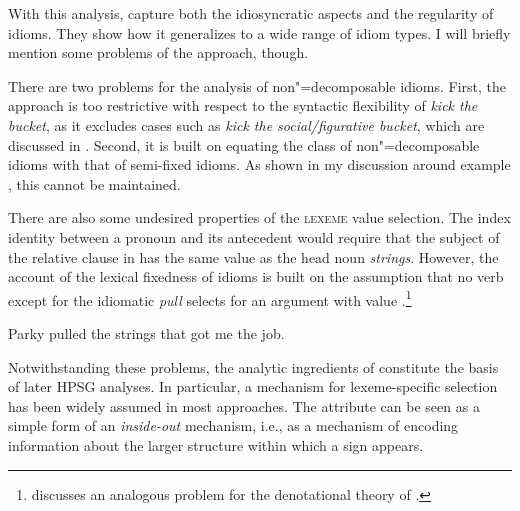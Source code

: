 \documentclass[output=paper
 	        ,biblatex
                ,babelshorthands
                ,newtxmath
                ,draftmode
                ,colorlinks, citecolor=brown
]{langscibook}
\begin{document}
\ea %
\label{ke-kick}
\z 


With this analysis, \citet{KE94a} capture both the idiosyncratic aspects and the regularity of idioms. 
They show how it generalizes to a wide range of idiom types. 
I will briefly mention some problems of the approach, though.

There are two problems for the analysis of non"=decomposable idioms.  First, the approach is too
restrictive with respect to the syntactic flexibility of \emph{kick the bucket}, as it excludes
cases such as \emph{kick the social/figurative bucket}, which are discussed in \citet{Ernst:81}.
Second, it is built on equating the class of non"=decomposable idioms with that of semi-fixed
idioms. As shown in my discussion around example , this cannot be maintained.

There are also some undesired properties of the \textsc{lexeme} value selection. The index identity
between a pronoun and its antecedent would require that the subject of the relative
clause in  has the same  value as the head noun
\emph{strings}. However, the account of the lexical fixedness of idioms is built on the assumption
that no verb except for the idiomatic \emph{pull} selects for an argument with  value
.\footnote{\citet{Pulman:93} discusses an analogous problem for the denotational
  theory of \citet{GKPS85a}.}

\ea \label{strings-relcl}
Parky pulled the strings that got me the job.
\citep[137]{McCawley:81}
\z 

Notwithstanding these problems, the analytic ingredients of \citet{KE94a} constitute the basis of
later HPSG analyses. In particular, a mechanism for lexeme-specific selection has been widely
assumed in most approaches. The attribute  can be seen as a simple form of an
\emph{inside-out} mechanism, i.e., as a mechanism of encoding information
about the larger structure within which a sign appears.
\end{document}

